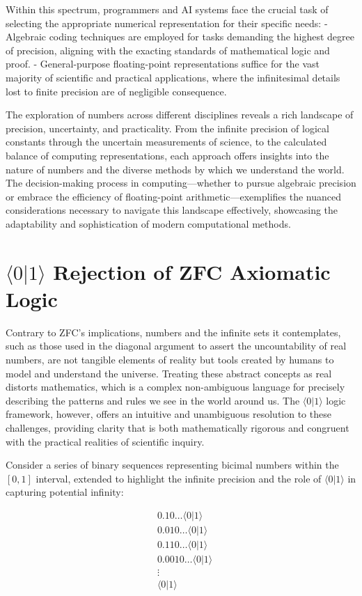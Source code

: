 \documentclass[12pt]{article}
\newcommand{\qbit}{\langle 0 | 1 \rangle}
\begin{document}
Within this spectrum, programmers and AI systems face the crucial task of selecting the appropriate numerical representation for their specific needs:
- Algebraic coding techniques are employed for tasks demanding the highest degree of precision, aligning with the exacting standards of mathematical logic and proof.
- General-purpose floating-point representations suffice for the vast majority of scientific and practical applications, where the infinitesimal details lost to finite precision are of negligible consequence.

The exploration of numbers across different disciplines reveals a rich landscape of precision, uncertainty, and practicality. From the infinite precision of logical constants through the uncertain measurements of science, to the calculated balance of computing representations, each approach offers insights into the nature of numbers and the diverse methods by which we understand the world. The decision-making process in computing—whether to pursue algebraic precision or embrace the efficiency of floating-point arithmetic—exemplifies the nuanced considerations necessary to navigate this landscape effectively, showcasing the adaptability and sophistication of modern computational methods.

\section*{\(\qbit\) Rejection of ZFC Axiomatic Logic}

Contrary to ZFC's implications, numbers and the infinite sets it contemplates, such as those used in the diagonal argument to assert the uncountability of real numbers, are not tangible elements of reality but tools created by humans to model and understand the universe. Treating these abstract concepts as real distorts mathematics, which is a complex non-ambiguous language for precisely describing the patterns and rules we see in the world around us. The \(\qbit\) logic framework, however, offers an intuitive and unambiguous resolution to these challenges, providing clarity that is both mathematically rigorous and congruent with the practical realities of scientific inquiry.

Consider a series of binary sequences representing bicimal numbers within the \([0,1]\) interval, extended to highlight the infinite precision and the role of \(\qbit\) in capturing potential infinity:

\begin{align*}
   & 0.10\ldots\qbit   \\
   & 0.010\ldots\qbit  \\
   & 0.110\ldots\qbit  \\
   & 0.0010\ldots\qbit \\
   & \vdots            \\
   & \qbit
\end{align*}
\end{document}
